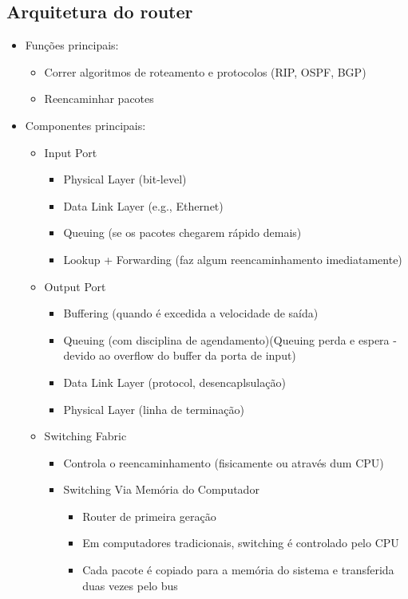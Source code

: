 \documentclass[../resumosRCOM.tex]{subfiles}
\begin{document}
\subsection{Arquitetura do router}
\begin{itemize}
    \item Funções principais:
    \begin{itemize}
        \item Correr algoritmos de roteamento e protocolos (RIP, OSPF, BGP)
		\item Reencaminhar pacotes
    \end{itemize}
    \item Componentes principais:
    \begin{itemize}
        \item Input Port
        \begin{itemize}
            \item Physical Layer (bit-level)
			\item Data Link Layer (e.g., Ethernet)
			\item Queuing (se os pacotes chegarem rápido demais)
			\item Lookup + Forwarding (faz algum reencaminhamento imediatamente)
        \end{itemize}
        \item Output Port
        \begin{itemize}
            \item Buffering (quando é excedida a velocidade de saída)
			\item Queuing (com disciplina de agendamento)(Queuing perda e espera - devido ao overflow do buffer da porta de input)
			\item Data Link Layer (protocol, desencaplsulação)
			\item Physical Layer (linha de terminação)
        \end{itemize}
        \item Switching Fabric
        \begin{itemize}
            \item Controla o reencaminhamento (fisicamente ou através dum CPU)
            \item Switching Via Memória do Computador
            \begin{itemize}
                \item Router de primeira geração
                \item Em computadores tradicionais, switching é controlado pelo CPU
                \item Cada pacote é copiado para a memória do sistema e transferida duas vezes pelo bus

\end{itemize}
\end{itemize}
\end{itemize}
\end{itemize}
\end{document}
